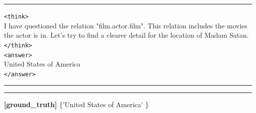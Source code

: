 \begin{table}[H]
\begin{reasonbox}[title=\framework{} Response Example - \dataset{SimpleQA}]
\vspace{0.5em}\hrule\vspace{0.5em}

\begin{blueblock}
\texttt{<think>} \\
I have questioned the relation "film.actor.film". This relation includes the movies the actor is in. Let's try to find a clearer detail for the location of Madam Satan. \\
\texttt{</think>} \\
\texttt{<answer>} \\
United States of America \\
\texttt{</answer>}
\end{blueblock}
\vspace{0.5em}\hrule\vspace{0.5em}
\vspace{0.1em}\hrule\vspace{0.5em}

\textbf{[ground\_truth]} \{'United States of America' \}


\end{reasonbox}
\end{table}


